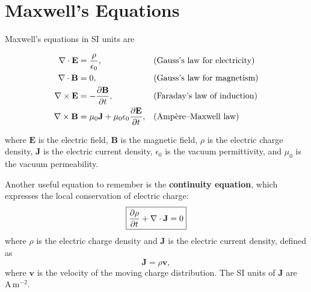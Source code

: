 

\section{Maxwell's Equations}\label{sec:maxwell_equations}

Maxwell's equations in SI units are

\begin{subequations}\label{eq:maxwell_equations}
\begin{align}
\nabla\cdot\mathbf E &= \frac{\rho}{\epsilon_0},
&& \text{(Gauss's law for electricity)}
\label{eq:gauss_electric}\\
\nabla\cdot\mathbf B &= 0,
&& \text{(Gauss's law for magnetism)}
\label{eq:gauss_magnetic}\\
\nabla\times\mathbf E &= -\pdv{\mathbf B}{t},
&& \text{(Faraday's law of induction)}
\label{eq:faraday}\\
\nabla\times\mathbf B &= \mu_0\mathbf J
+ \mu_0\epsilon_0\pdv{\mathbf E}{t},
&& \text{(Ampère--Maxwell law)}
\label{eq:ampere_maxwell}
\end{align}
\end{subequations}

where $\mathbf E$ is the electric field,
$\mathbf B$ is the magnetic field,
$\rho$ is the electric charge density,
$\mathbf J$ is the electric current density,
$\epsilon_0$ is the vacuum permittivity,
and $\mu_0$ is the vacuum permeability.

Another useful equation to remember is the
\textbf{continuity equation}, which expresses
the local conservation of electric charge:
\begin{equation}
\boxed{
\pdv{\rho}{t} + \nabla\cdot\mathbf J = 0
}
\label{eq:continuity}
\end{equation}
where $\rho$ is the electric charge density
and $\mathbf J$ is the electric current density,
defined as
\begin{equation}
\mathbf J = \rho\mathbf v,
\label{eq:current_density}
\end{equation}
where $\mathbf v$ is the velocity of the moving
charge distribution. The SI units of $\mathbf J$
are $\mathrm{A\,m^{-2}}$.